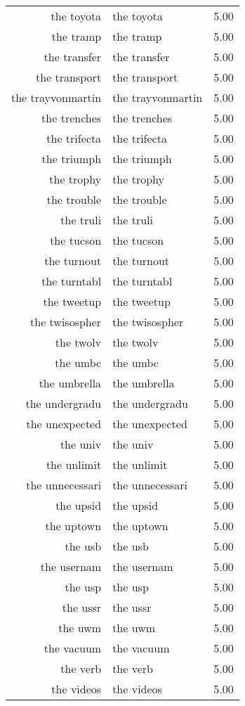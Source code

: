 \begin{table}[ht]
\begin{tabular}{rlr}
  the toyota & the toyota & 5.00 \\ 
  the tramp & the tramp & 5.00 \\ 
  the transfer & the transfer & 5.00 \\ 
  the transport & the transport & 5.00 \\ 
  the trayvonmartin & the trayvonmartin & 5.00 \\ 
  the trenches & the trenches & 5.00 \\ 
  the trifecta & the trifecta & 5.00 \\ 
  the triumph & the triumph & 5.00 \\ 
  the trophy & the trophy & 5.00 \\ 
  the trouble & the trouble & 5.00 \\ 
  the truli & the truli & 5.00 \\ 
  the tucson & the tucson & 5.00 \\ 
  the turnout & the turnout & 5.00 \\ 
  the turntabl & the turntabl & 5.00 \\ 
  the tweetup & the tweetup & 5.00 \\ 
  the twisospher & the twisospher & 5.00 \\ 
  the twolv & the twolv & 5.00 \\ 
  the umbc & the umbc & 5.00 \\ 
  the umbrella & the umbrella & 5.00 \\ 
  the undergradu & the undergradu & 5.00 \\ 
  the unexpected & the unexpected & 5.00 \\ 
  the univ & the univ & 5.00 \\ 
  the unlimit & the unlimit & 5.00 \\ 
  the unnecessari & the unnecessari & 5.00 \\ 
  the upsid & the upsid & 5.00 \\ 
  the uptown & the uptown & 5.00 \\ 
  the usb & the usb & 5.00 \\ 
  the usernam & the usernam & 5.00 \\ 
  the usp & the usp & 5.00 \\ 
  the ussr & the ussr & 5.00 \\ 
  the uwm & the uwm & 5.00 \\ 
  the vacuum & the vacuum & 5.00 \\ 
  the verb & the verb & 5.00 \\ 
  the videos & the videos & 5.00 \\ 

\end{tabular}
\end{table}
